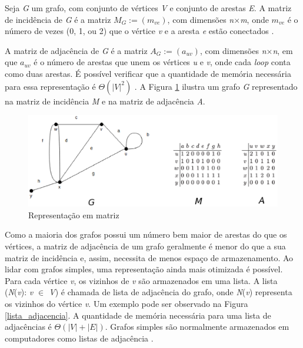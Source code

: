 Seja \textit{G} um grafo, com conjunto de vértices \textit{V} e conjunto de arestas \textit{E}. A matriz de incidência de \textit{G} é a matriz $M_G:= (m_{ve})$, com dimensões \textit{n$\times$m}, onde $m_{ve}$ é o número de vezes (0, 1, ou 2) que o vértice \textit{v} e a aresta \textit{e} estão conectados \cite{Bondy:2007}.

A matriz de adjacência de \textit{G} é a matriz $A_G := (a_{uv})$, com dimensões \textit{n$\times$n}, em que $a_{uv}$ é o número de arestas que unem os vértices \textit{u} e \textit{v}, onde cada \textit{loop} conta como duas arestas. É possível verificar que a quantidade de memória necessária para essa representação é $\Theta(|\textit{V}|^2)$ \cite{Bondy:2007}. A Figura \ref{matriz} ilustra um grafo \textit{G} representado na matriz de incidência \textit{M} e na matriz de adjacência \textit{A}.

\begin{figure}[!h]
	\centering
	\includegraphics[scale=0.6]{figuras/capitulo2/matriz.eps}
	\caption[Representação em matriz]{Representação em matriz \cite{Bondy:2007}}
	\label{matriz}
\end{figure}

Como a maioria dos grafos possui um número bem maior de arestas do que os vértices, a matriz de adjacência de um grafo geralmente é menor do que a sua matriz de incidência e, assim, necessita de menos espaço de armazenamento. Ao lidar com grafos simples, uma representação ainda mais otimizada é possível. Para cada vértice \textit{v}, os vizinhos de \textit{v} são armazenados em uma lista. A lista (\textit{N}(\textit{v}): \textit{v $\in$ V}) é chamada de lista de adjacência do grafo, onde \textit{N}(\textit{v}) representa os vizinhos do vértice \textit{v}. Um exemplo pode ser observado na Figura \ref{lista_adjacencia}. A quantidade de memória necessária para uma lista de adjacências é $\Theta(|\textit{V}| + |\textit{E}|)$. Grafos simples são normalmente armazenados em computadores como listas de adjacência \cite{Costa:2011}.

